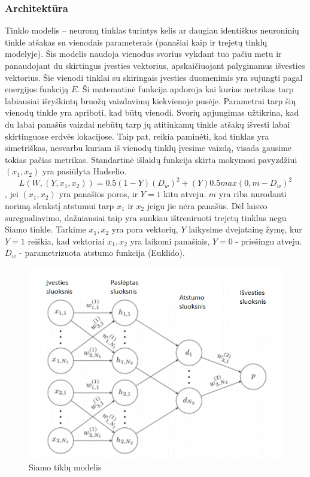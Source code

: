 \documentclass{VUMIFPSkursinis}
\begin{document}
\subsubsection{Architektūra}
Tinklo modelis – neuronų tinklas turintys kelis ar daugiau identiškus neuroninių tinkle atšakas su vienodais parameterais \cite{Siamese_Network} (panašiai kaip ir trejetų tinklų modelyje). Šis modelis naudoja vienodus svorius vykdant tuo pačiu metu ir panaudojant du skirtingus įvesties vektorius, apskaičiuojant palyginamus išvesties vektorius. Šie vienodi tinklai su skiringais įvesties duomenimis yra sujungti pagal energijos funkciją $E$. Ši matematinė funkcija apdoroja kai kurias metrikas tarp labiausiai išryškintų bruožų vaizdavimų kiekvienoje pusėje.
Parametrai tarp šių vienodų tinkle yra apriboti, kad būtų vienodi. Svorių apjungimas užtikrina, kad du labai panašūs vaizdai nebūtų tarp jų atitinkamų tinkle  atšakų išvesti labai skirtinguose erdvės lokacijose. Taip pat, reikia paminėti, kad tinklas yra simetriškas, nesvarbu kuriam iš vienodų tinklų įvesime vaizdą, visada gausime tokias pačias metrikas.
Standartinė išlaidų funkcija skirta mokymosi pavyzdžiui $(x_1, x_2)$ yra pasiūlyta Hadselio. \[L(W,(Y, x_1, x_2)) = 0.5(1 − Y )(D_w)^2 + (Y) 0.5 {max(0, m − D_w)}^2\], jei $(x_1, x_2)$  yra panašios poros, ir $Y = 1$ kitu atveju. $m$ yra riba nurodanti norimą slenkstį atstumui tarp $x_1$ ir $x_2$ jeigu jie nėra panašūs. Dėl laisvo suregualiavimo, dažniausiai taip yra sunkiau ištreniruoti trejetų tinklus negu Siamo tinkle. Tarkime $x_1, x_2$ yra pora vektorių, $Y$ laikysime dvejatainę žymę, kur $Y = 1$ reiškia, kad vektoriai $x_1, x_2$ yra laikomi panašiais, $Y = 0$ - priešingu atveju. $D_w$ - parametrizuota atstumo funkcija (Euklido).

\begin{figure}[H]
\centering
\includegraphics[scale=1.0]{img/Siamese}
\caption{Siamo tiklų modelis} %
\label{img:mlp}
\end{figure}
\end{document}
